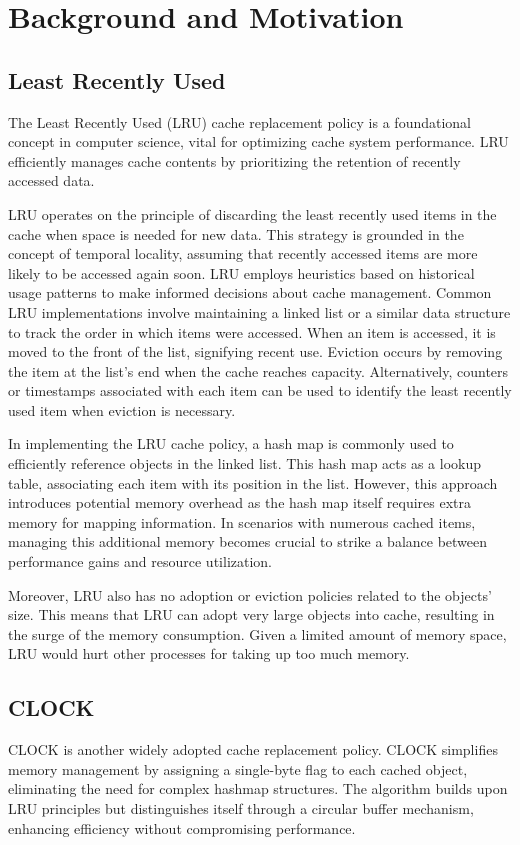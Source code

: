 \documentclass[journal,10.5pt,onecolumn]{IEEEtran}
\begin{document}
\section{Background and Motivation}

\subsection{Least Recently Used}
The Least Recently Used (LRU) \cite{b1} cache replacement policy is a foundational concept in computer science, vital for optimizing cache system performance. LRU efficiently manages cache contents by prioritizing the retention of recently accessed data.

LRU operates on the principle of discarding the least recently used items in the cache when space is needed for new data. This strategy is grounded in the concept of temporal locality, assuming that recently accessed items are more likely to be accessed again soon. LRU employs heuristics based on historical usage patterns to make informed decisions about cache management.
Common LRU implementations involve maintaining a linked list or a similar data structure to track the order in which items were accessed. When an item is accessed, it is moved to the front of the list, signifying recent use. Eviction occurs by removing the item at the list's end when the cache reaches capacity. Alternatively, counters or timestamps associated with each item can be used to identify the least recently used item when eviction is necessary.

In implementing the LRU cache policy, a hash map is commonly used to efficiently reference objects in the linked list. This hash map acts as a lookup table, associating each item with its position in the list. However, this approach introduces potential memory overhead as the hash map itself requires extra memory for mapping information. In scenarios with numerous cached items, managing this additional memory becomes crucial to strike a balance between performance gains and resource utilization.

Moreover, LRU also has no adoption or eviction policies related to the objects' size. This means that LRU can adopt very large objects into cache, resulting in the surge of the memory consumption. Given a limited amount of memory space, LRU would hurt other processes for taking up too much memory.

\subsection{CLOCK}
CLOCK \cite{b1} is another widely adopted cache replacement policy. CLOCK simplifies memory management by assigning a single-byte flag to each cached object, eliminating the need for complex hashmap structures. The algorithm builds upon LRU principles but distinguishes itself through a circular buffer mechanism, enhancing efficiency without compromising performance.
\end{document}

